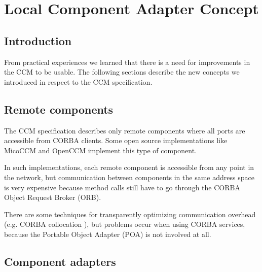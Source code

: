 \chapter{Local Component Adapter Concept}
\begin{flushright}
{\it }
\end{flushright}

\section{Introduction}
From practical experiences we learned that there is a need for improvements in
the CCM to be usable. The following sections describe the new concepts we
introduced in respect to the CCM specification.


\section{Remote components}

The CCM specification describes only remote components where all ports are
accessible from CORBA clients. Some open source implementations like MicoCCM
\cite{MicoCCM} and OpenCCM \cite{MarvieMerle2001} implement this type of
component.

In such implementations, each remote component is accessible from any point in
the network, but communication between components in the same address space is
very expensive because method calls still have to go through the CORBA Object
Request Broker (ORB).

There are some techniques for transparently optimizing communication overhead
(e.g. CORBA collocation \cite{ObjectInterconnections18, wang00optimizing}), but
problems occur when using CORBA services, because the Portable Object Adapter
(POA) is not involved at all.


\section{Component adapters}

